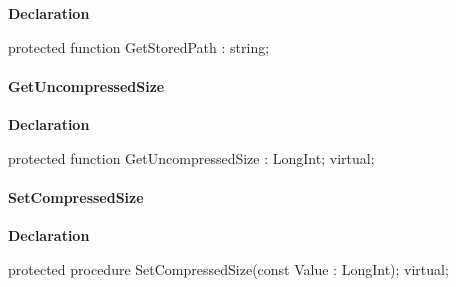 \documentclass{report}
\newif\ifpdf
\begin{document}
\label{AbArcTyp.TAbArchiveItem-GetStoredPath}
\begin{list}{}{
\setlength{\itemindent}{0cm}
\setlength{\listparindent}{0cm}
\setlength{\leftmargin}{\evensidemargin}
\addtolength{\leftmargin}{\tmplength}
\settowidth{\labelsep}{X}
\addtolength{\leftmargin}{\labelsep}
\setlength{\labelwidth}{\tmplength}
}
\item[\textbf{Declaration}\hfill]
\ifpdf
\begin{flushleft}
\fi
\begin{ttfamily}
protected function GetStoredPath : string;\end{ttfamily}

\ifpdf
\end{flushleft}
\fi

\end{list}
\paragraph*{GetUncompressedSize}\hspace*{\fill}

\label{AbArcTyp.TAbArchiveItem-GetUncompressedSize}
\begin{list}{}{
\setlength{\itemindent}{0cm}
\setlength{\listparindent}{0cm}
\setlength{\leftmargin}{\evensidemargin}
\addtolength{\leftmargin}{\tmplength}
\settowidth{\labelsep}{X}
\addtolength{\leftmargin}{\labelsep}
\setlength{\labelwidth}{\tmplength}
}
\item[\textbf{Declaration}\hfill]
\ifpdf
\begin{flushleft}
\fi
\begin{ttfamily}
protected function GetUncompressedSize : LongInt; virtual;\end{ttfamily}

\ifpdf
\end{flushleft}
\fi

\end{list}
\paragraph*{SetCompressedSize}\hspace*{\fill}

\label{AbArcTyp.TAbArchiveItem-SetCompressedSize}
\begin{list}{}{
\setlength{\itemindent}{0cm}
\setlength{\listparindent}{0cm}
\setlength{\leftmargin}{\evensidemargin}
\addtolength{\leftmargin}{\tmplength}
\settowidth{\labelsep}{X}
\addtolength{\leftmargin}{\labelsep}
\setlength{\labelwidth}{\tmplength}
}
\item[\textbf{Declaration}\hfill]
\ifpdf
\begin{flushleft}
\fi
\begin{ttfamily}
protected procedure SetCompressedSize(const Value : LongInt); virtual;\end{ttfamily}

\ifpdf
\end{flushleft}
\fi

\end{list}
\end{document}
